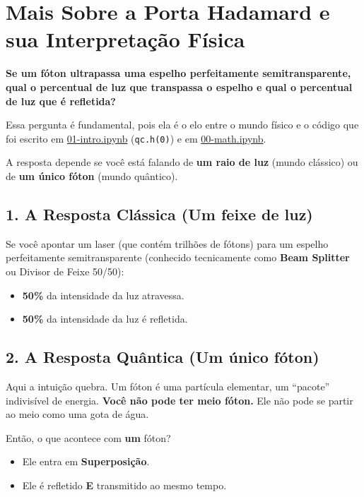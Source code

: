 \documentclass[
  brazilian,
]{report}
\providecommand{\tightlist}{%
  \setlength{\itemsep}{0pt}\setlength{\parskip}{0pt}}
\begin{document}
\section{Mais Sobre a Porta Hadamard e sua Interpretação
Física}\label{mais-sobre-a-porta-hadamard-e-sua-interpretauxe7uxe3o-fuxedsica}

\textbf{Se um fóton ultrapassa uma espelho perfeitamente
semitransparente, qual o percentual de luz que transpassa o espelho e
qual o percentual de luz que é refletida?}

Essa pergunta é fundamental, pois ela é o elo entre o mundo físico e o
código que foi escrito em \url{01-intro.ipynb} (\texttt{qc.h(0)}) e em
\url{00-math.ipynb}.

A resposta depende se você está falando de \textbf{um raio de luz}
(mundo clássico) ou de \textbf{um único fóton} (mundo quântico).

\subsection{1. A Resposta Clássica (Um feixe de
luz)}\label{a-resposta-cluxe1ssica-um-feixe-de-luz}

Se você apontar um laser (que contém trilhões de fótons) para um espelho
perfeitamente semitransparente (conhecido tecnicamente como \textbf{Beam
Splitter} ou Divisor de Feixe 50/50):

\begin{itemize}
\tightlist
\item
  \textbf{50\%} da intensidade da luz atravessa.
\item
  \textbf{50\%} da intensidade da luz é refletida.
\end{itemize}

\subsection{2. A Resposta Quântica (Um único
fóton)}\label{a-resposta-quuxe2ntica-um-uxfanico-fuxf3ton}

Aqui a intuição quebra. Um fóton é uma partícula elementar, um
``pacote'' indivisível de energia. \textbf{Você não pode ter meio
fóton.} Ele não pode se partir ao meio como uma gota de água.

Então, o que acontece com \textbf{um} fóton?

\begin{itemize}
\tightlist
\item
  Ele entra em \textbf{Superposição}.
\item
  Ele é refletido \textbf{E} transmitido ao mesmo tempo.
\end{itemize}
\end{document}
